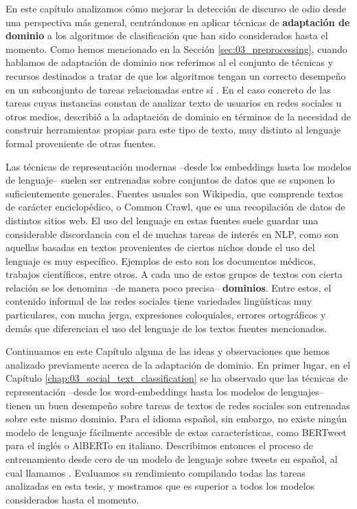 \label{chap:07_domain_adaptation}
\newcommand{\deacc}[0]{\textbf{deacc}}
\newcommand{\cased}[0]{\textbf{cased}}
\newcommand{\uncased}[0]{\textbf{uncased}}

En este capítulo analizamos cómo mejorar la detección de discurso de odio desde una perspectiva más general, centrándonos en aplicar técnicas de \textbf{adaptación de dominio} a los algoritmos de clasificación que han sido considerados hasta el momento. Como hemos mencionado en la Sección \ref{sec:03_preprocessing}, cuando hablamos de adaptación de dominio nos referimos al el conjunto de técnicas y recursos destinados a tratar de que los algoritmos tengan un correcto desempeño en un subconjunto de tareas relacionadas entre sí \cite{goodfellow2016deep}. En el caso concreto de las tareas cuyas instancias constan de analizar texto de usuarios en redes sociales u otros medios, \citet{eisenstein2013bad} describió a la adaptación de dominio en términos de la necesidad de construir herramientas propias para este tipo de texto, muy distinto al lenguaje formal proveniente de otras fuentes.

Las técnicas de representación modernas --desde los embeddings hasta los modelos de lenguaje-- suelen ser entrenadas sobre conjuntos de datos que se suponen lo suficientemente generales. Fuentes usuales son Wikipedia, que comprende textos de carácter enciclopédico, o Common Crawl, que es una recopilación de datos de distintos sitios web. El uso del lenguaje en estas fuentes suele guardar una considerable discordancia con el de muchas tareas de interés en NLP, como son aquellas basadas en textos provenientes de ciertos nichos donde el uso del lenguaje es muy específico. Ejemplos de esto son los documentos médicos, trabajos científicos, entre otros. A cada uno de estos grupos de textos con cierta relación se los denomina --de manera poco precisa-- \textbf{dominios}. Entre estos, el contenido informal de las redes sociales tiene variedades lingüísticas muy particulares, con mucha jerga, expresiones coloquiales, errores ortográficos y demás que diferencian el uso del lenguaje de los textos fuentes mencionados.

Continuamos en este Capítulo alguna de las ideas y observaciones que hemos analizado previamente acerca de la adaptación de dominio. En primer lugar, en el Capítulo \ref{chap:03_social_text_classification} se ha observado que las técnicas de representación --desde los word-embeddings hasta los modelos de lenguajes-- tienen un buen desempeño sobre tareas de textos de redes sociales son entrenadas sobre este mismo dominio. Para el idioma español, sin embargo, no existe ningún modelo de lenguaje fácilmente accesible de estas características, como BERTweet para el inglés o AlBERTo en italiano. Describimos entonces el proceso de entrenamiento desde cero de un modelo de lenguaje sobre tweets en español, al cual llamamos \robertuito{}. Evaluamos su rendimiento compilando todas las tareas analizadas en esta tesis, y mostramos que es superior a todos los modelos considerados hasta el momento.


